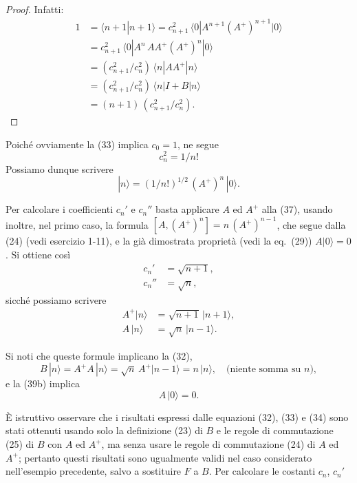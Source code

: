\documentclass[11pt, a4paper]{book}
\numberwithin{equation}{section}
\begin{document}
\begin{proof}
Infatti:
\begin{align*}
1 &= \langle n+1|n+1\rangle
   = c_{n+1}^2\,\langle 0|A^{n+1}(A^+)^{n+1}|0\rangle \\
  &= c_{n+1}^2\,\langle 0|A^n\,AA^+(A^+)^n|0\rangle \\
  &= (c_{n+1}^2/c_n^2)\,\langle n|AA^+|n\rangle \\
  &= (c_{n+1}^2/c_n^2)\,\langle n|I+B|n\rangle \\
  &= (n+1)\,(c_{n+1}^2/c_n^2).
\end{align*}
\end{proof}


Poiché ovviamente la (33) implica $c_0 = 1$, ne segue
\begin{equation}
c_n^2 = 1/n!
\end{equation}
Possiamo dunque scrivere
\begin{equation}
|n\rangle = (1/n!)^{1/2}\,(A^+)^n\,|0\rangle.
\end{equation}

Per calcolare i coefficienti $c_n'$ e $c_n''$ basta applicare $A$ ed
$A^+$ alla (37), usando inoltre, nel primo caso, la formula
$[A,(A^+)^n] = n\,(A^+)^{n-1}$, che segue dalla (24) (vedi esercizio
1-11), e la già dimostrata proprietà (vedi la eq.\ (29)) $A|0\rangle = 0$.
Si ottiene così
\begin{align}
c_n'  &= \sqrt{n+1}, \tag{38a} \\
c_n'' &= \sqrt{n},   \tag{38b}
\end{align}
sicché possiamo scrivere
\begin{align}
A^+|n\rangle &= \sqrt{n+1}\,|n+1\rangle, \tag{39a} \\
A\,|n\rangle &= \sqrt{n}\,|n-1\rangle.   \tag{39b}
\end{align}

Si noti che queste formule implicano la (32),
\[
B\,|n\rangle = A^+A\,|n\rangle = \sqrt{n}\,A^+|n-1\rangle
= n\,|n\rangle,
\quad \text{(niente somma su }n\text{)},
\]
e la (39b) implica
\begin{equation}
A\,|0\rangle = 0.
\end{equation}

È istruttivo osservare che i risultati espressi dalle equazioni (32), (33)
e (34) sono stati ottenuti usando solo la definizione (23) di $B$ e le
regole di commutazione (25) di $B$ con $A$ ed $A^+$, ma senza usare le
regole di commutazione (24) di $A$ ed $A^+$; pertanto questi risultati
sono ugualmente validi nel caso considerato nell'esempio precedente, salvo
a sostituire $F$ a $B$. Per calcolare le costanti $c_n$, $c_n'$
\end{document}
